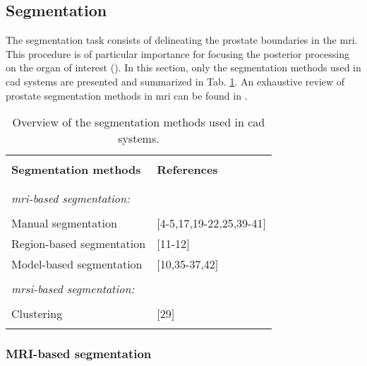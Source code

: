 

\subsection{Segmentation} \label{subsec:segmentation}

The segmentation task consists of delineating the prostate boundaries in the \ac{mri}. This procedure is of particular importance for focusing the posterior processing on the organ of interest (\cite{Ghose2012}). In this section, only the segmentation methods used in \ac{cad} systems are presented and summarized in Tab. \ref{tab:seg}. An exhaustive review of prostate segmentation methods in \ac{mri} can be found in \cite{Ghose2012}.

\begin{table}
	\caption{Overview of the segmentation methods used in \ac{cad} systems.}
	\small
	\begin{tabular}{p{.65\linewidth} p{.25\linewidth}}
		\hline \\ [-1.5ex]
		\textbf{Segmentation methods} & \textbf{References} \\ \\ [-1.5ex]
		\hline \\ [-1.5ex]
		\textit{\ac{mri}-based segmentation:} & \\ \\ [-1.5ex]
		\quad Manual segmentation & $[$4-5,17,19-22,25,39-41$]$ \\
		\quad Region-based segmentation & $[$11-12$]$ \\
		\quad Model-based segmentation & $[$10,35-37,42$]$ \\ \\ [-1.5ex]
		\textit{\ac{mrsi}-based segmentation:} & \\ \\ [-1.5ex]
		\quad Clustering & $[$29$]$ \\ \\ [-1.5ex]
		\hline
	\end{tabular}
	\label{tab:seg}
\end{table}

\subsubsection{MRI-based segmentation}

